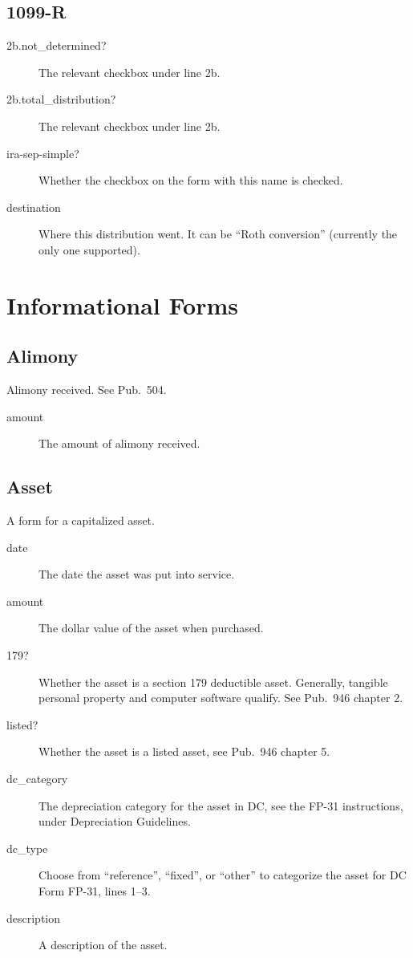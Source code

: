 \documentclass[12pt]{article}
\begin{document}
\subsection{1099-R}

\begin{description}
\item[2b.not\_determined?] The relevant checkbox under line 2b.
\item[2b.total\_distribution?] The relevant checkbox under line 2b.
\item[ira-sep-simple?] Whether the checkbox on the form with this name is
checked.
\item[destination] Where this distribution went. It can be ``Roth conversion''
(currently the only one supported).
\end{description}


\section{Informational Forms}



\subsection{Alimony}

Alimony received. See Pub.\ 504.

\begin{description}
\item[amount] The amount of alimony received.
\end{description}


\subsection{Asset}

A form for a capitalized asset.

\begin{description}
\item[date] The date the asset was put into service.
\item[amount] The dollar value of the asset when purchased.
\item[179?] Whether the asset is a section 179 deductible asset. Generally,
tangible personal property and computer software qualify. See Pub.~946 chapter
2.
\item[listed?] Whether the asset is a listed asset, see Pub.~946 chapter 5.
\item[dc\_category] The depreciation category for the asset in DC, see the FP-31
instructions, under Depreciation Guidelines.
\item[dc\_type] Choose from ``reference'', ``fixed'', or ``other'' to categorize
the asset for DC Form FP-31, lines 1--3.
\item[description] A description of the asset.
\end{description}
\end{document}
